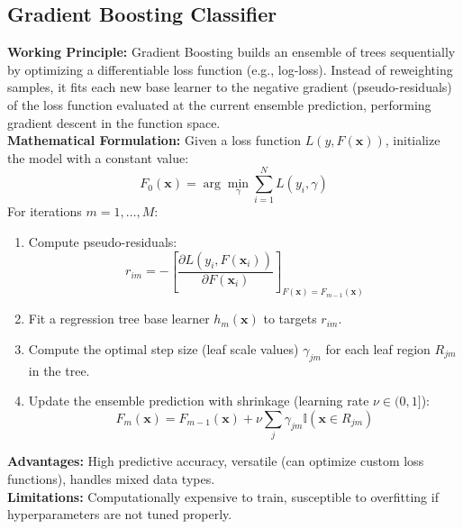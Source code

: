 \documentclass[12pt,a4paper]{article}
\begin{document}
\subsection{Gradient Boosting Classifier}
\textbf{Working Principle:} Gradient Boosting builds an ensemble of trees sequentially by optimizing a differentiable loss function (e.g., log-loss). Instead of reweighting samples, it fits each new base learner to the negative gradient (pseudo-residuals) of the loss function evaluated at the current ensemble prediction, performing gradient descent in the function space.\\
\textbf{Mathematical Formulation:}
Given a loss function $L(y, F(\mathbf{x}))$, initialize the model with a constant value:
\begin{equation}
F_0(\mathbf{x}) = \arg\min_{\gamma} \sum_{i=1}^N L(y_i, \gamma)
\end{equation}
For iterations $m = 1, \dots, M$:
\begin{enumerate}
    \item Compute pseudo-residuals:
    \begin{equation}
    r_{im} = - \left[ \frac{\partial L(y_i, F(\mathbf{x}_i))}{\partial F(\mathbf{x}_i)} \right]_{F(\mathbf{x}) = F_{m-1}(\mathbf{x})}
    \end{equation}
    \item Fit a regression tree base learner $h_m(\mathbf{x})$ to targets $r_{im}$.
    \item Compute the optimal step size (leaf scale values) $\gamma_{jm}$ for each leaf region $R_{jm}$ in the tree.
    \item Update the ensemble prediction with shrinkage (learning rate $\nu \in (0, 1]$):
    \begin{equation}
    F_m(\mathbf{x}) = F_{m-1}(\mathbf{x}) + \nu \sum_{j} \gamma_{jm} \mathbb{I}(\mathbf{x} \in R_{jm})
    \end{equation}
\end{enumerate}
\textbf{Advantages:} High predictive accuracy, versatile (can optimize custom loss functions), handles mixed data types.\\
\textbf{Limitations:} Computationally expensive to train, susceptible to overfitting if hyperparameters are not tuned properly.
\end{document}

